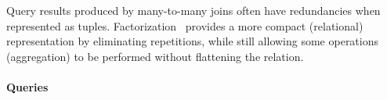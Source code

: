 
Query results produced by many-to-many joins often have redundancies when represented as tuples.
Factorization~\cite{DBLP:journals/sigmod/OlteanuS16} provides a more compact (relational) representation by eliminating repetitions,
while still allowing some operations (\eg aggregation) to be performed without flattening the relation.


\paragraph{Queries}
{\raggedright

}